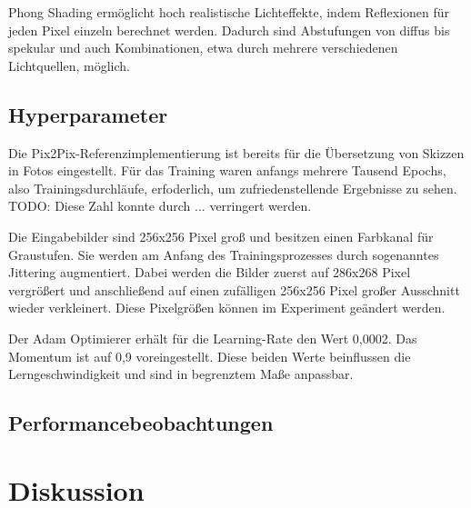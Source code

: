 Phong Shading ermöglicht hoch realistische Lichteffekte, indem Reflexionen für jeden Pixel einzeln berechnet werden. Dadurch sind Abstufungen von diffus bis spekular und auch Kombinationen, etwa durch mehrere verschiedenen Lichtquellen, möglich.

\section{Hyperparameter}
\label{sec:hyperparams}
Die Pix2Pix-Referenzimplementierung ist bereits für die Übersetzung von Skizzen in Fotos eingestellt. Für das Training waren anfangs mehrere Tausend Epochs, also Trainingsdurchläufe, erfoderlich, um zufriedenstellende Ergebnisse zu sehen. TODO: Diese Zahl konnte durch ... verringert werden.

Die Eingabebilder sind 256x256 Pixel groß und besitzen einen Farbkanal für Graustufen. Sie werden am Anfang des Trainingsprozesses durch sogenanntes Jittering augmentiert. Dabei werden die Bilder zuerst auf 286x268 Pixel vergrößert und anschließend auf einen zufälligen 256x256 Pixel großer Ausschnitt wieder verkleinert. Diese  Pixelgrößen können im Experiment geändert werden.

Der Adam Optimierer \cite{kingma2017adam} erhält für die Learning-Rate den Wert 0,0002. Das Momentum ist auf 0,9 voreingestellt. Diese beiden Werte beinflussen die Lerngeschwindigkeit und sind in begrenztem Maße anpassbar.

\section{Performancebeobachtungen}
\label{sec:performance}


\chapter{Diskussion}
\label{sec:conclusion}
